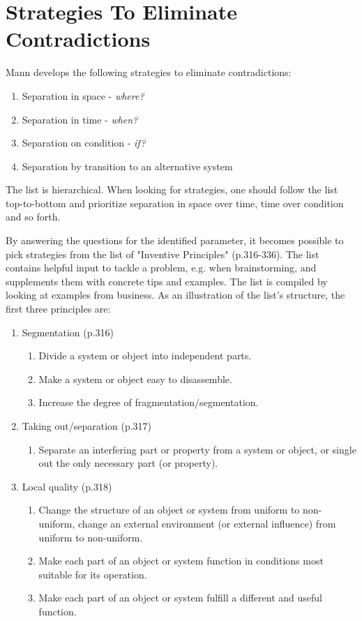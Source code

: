 \documentclass{article}
\begin{document}
\section{Strategies To Eliminate Contradictions}

Mann develops the following strategies to eliminate contradictions:

\begin{enumerate}
    \item Separation in space - \textit{where?}
    \item Separation in time - \textit{when?}
    \item Separation on condition - \textit{if?}
    \item Separation by transition to an alternative system
\end{enumerate}

The list is hierarchical. When looking for strategies, one should follow the list top-to-bottom and prioritize separation in space over time, time over condition and so forth. 

By answering the questions for the identified parameter, it becomes possible to pick strategies from the list of "Inventive Principles" (p.316-336). The list contains helpful input to tackle a problem, e.g. when brainstorming, and supplements them with concrete tips and examples. The list is compiled by looking at examples from business. As an illustration of the list's structure, the first three principles are:
\begin{enumerate}
    \item Segmentation (p.316)
       \begin{enumerate}
            \item Divide a system or object into independent parts.
            \item Make a system or object easy to disassemble.
            \item Increase the degree of fragmentation/segmentation.
       \end{enumerate}
    \item Taking out/separation (p.317)
       \begin{enumerate}
            \item Separate an interfering part or property from a system or object, or single out the only necessary part (or property).
       \end{enumerate}
    \item Local quality (p.318)
       \begin{enumerate}
            \item Change the structure of an object or system from uniform to non-uniform, change an external environment (or external influence) from uniform to non-uniform.
            \item Make each part of an object or system function in conditions most suitable for its operation.
            \item Make each part of an object or system fulfill a different and useful function.
       \end{enumerate}
\end{enumerate}
\end{document}
